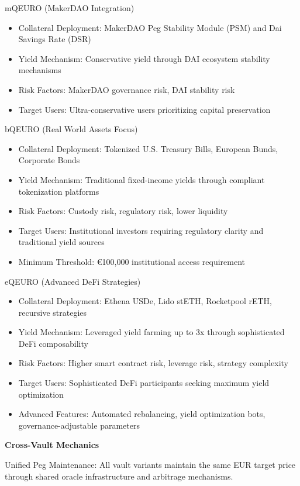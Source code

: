 mQEURO (MakerDAO Integration)

\begin{itemize}
\item
  Collateral Deployment: MakerDAO Peg Stability Module (PSM) and Dai
  Savings Rate (DSR)
\item
  Yield Mechanism: Conservative yield through DAI ecosystem stability
  mechanisms
\item
  Risk Factors: MakerDAO governance risk, DAI stability risk
\item
  Target Users: Ultra-conservative users prioritizing capital
  preservation
\end{itemize}

bQEURO (Real World Assets Focus)

\begin{itemize}
\item
  Collateral Deployment: Tokenized U.S. Treasury Bills, European Bunds,
  Corporate Bonds
\item
  Yield Mechanism: Traditional fixed-income yields through compliant
  tokenization platforms
\item
  Risk Factors: Custody risk, regulatory risk, lower liquidity
\item
  Target Users: Institutional investors requiring regulatory clarity and
  traditional yield sources
\item
  Minimum Threshold: €100,000 institutional access requirement
\end{itemize}

eQEURO (Advanced DeFi Strategies)

\begin{itemize}
\item
  Collateral Deployment: Ethena USDe, Lido stETH, Rocketpool rETH,
  recursive strategies
\item
  Yield Mechanism: Leveraged yield farming up to 3x through
  sophisticated DeFi composability
\item
  Risk Factors: Higher smart contract risk, leverage risk, strategy
  complexity
\item
  Target Users: Sophisticated DeFi participants seeking maximum yield
  optimization
\item
  Advanced Features: Automated rebalancing, yield optimization bots,
  governance-adjustable parameters
\end{itemize}

\textbf{Cross-Vault Mechanics}

Unified Peg Maintenance: All vault variants maintain the same EUR target
price through shared oracle infrastructure and arbitrage mechanisms.

